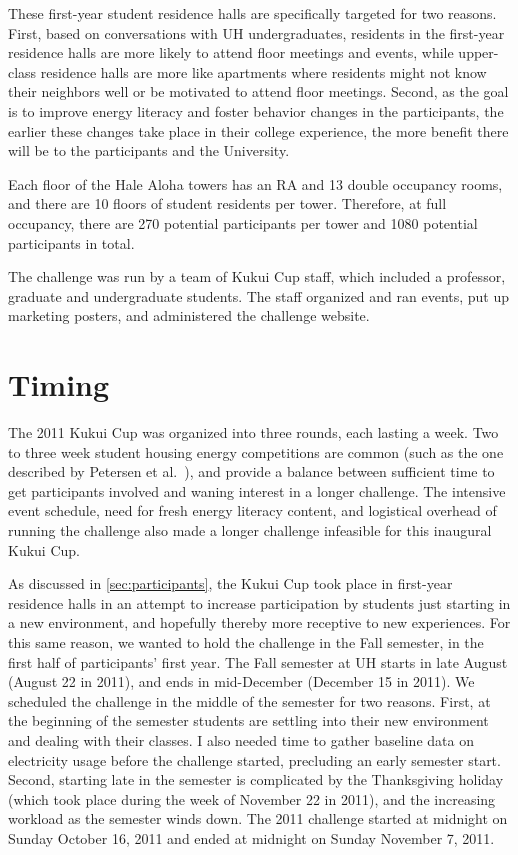 These first-year student residence halls are specifically targeted for two reasons. First, based on conversations with UH \Manoa undergraduates, residents in the first-year residence halls are more likely to attend floor meetings and events, while upper-class residence halls are more like apartments where residents might not know their neighbors well or be motivated to attend floor meetings. Second, as the goal is to improve energy literacy and foster behavior changes in the participants, the earlier these changes take place in their college experience, the more benefit there will be to the participants and the University.

Each floor of the Hale Aloha towers has an RA and 13 double occupancy rooms, and there are 10 floors of student residents per tower. Therefore, at full occupancy, there are 270 potential participants per tower and 1080 potential participants in total.

The challenge was run by a team of Kukui Cup staff, which included a professor, graduate and undergraduate students. The staff organized and ran events, put up marketing posters, and administered the challenge website.


\section{Timing}

The 2011 Kukui Cup was organized into three rounds, each lasting a week. Two to three week student housing energy competitions are common (such as the one described by Petersen et al.~\cite{petersen-dorm-energy-reduction}), and provide a balance between sufficient time to get participants involved and waning interest in a longer challenge. The intensive event schedule, need for fresh energy literacy content, and logistical overhead of running the challenge also made a longer challenge infeasible for this inaugural Kukui Cup.

As discussed in \autoref{sec:participants}, the Kukui Cup took place in first-year residence halls in an attempt to increase participation by students just starting in a new environment, and hopefully thereby more receptive to new experiences. For this same reason, we wanted to hold the challenge in the Fall semester, in the first half of participants' first year. The Fall semester at UH \Manoa starts in late August (August 22 in 2011), and ends in mid-December (December 15 in 2011). We scheduled the challenge in the middle of the semester for two reasons. First, at the beginning of the semester students are settling into their new environment and dealing with their classes. I also needed time to gather baseline data on electricity usage before the challenge started, precluding an early semester start. Second, starting late in the semester is complicated by the Thanksgiving holiday (which took place during the week of November 22 in 2011), and the increasing workload as the semester winds down. The 2011 challenge started at midnight on Sunday October 16, 2011 and ended at midnight on Sunday November 7, 2011.



